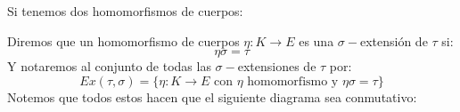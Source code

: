 \begin{definicion}
    Si tenemos dos homomorfismos de cuerpos:
    \begin{figure}[H]
        \centering
    \end{figure}
    \noindent
    Diremos que un homomorfismo de cuerpos $\eta:K\to E$ es una $\sigma-$extensión de $\tau$ si:
    \begin{equation*}
        \eta\sigma = \tau
    \end{equation*}
    \noindent
    Y notaremos al conjunto de todas las $\sigma-$extensiones de $\tau$ por:
    \begin{equation*}
        Ex(\tau,\sigma) = \{\eta:K\to E \text{\ con\ } \eta \text{\ homomorfismo y\ } \eta \sigma = \tau\}
    \end{equation*}
    Notemos que todos estos hacen que el siguiente diagrama sea conmutativo:
    \begin{figure}[H]
        \centering
    \end{figure}
\end{definicion}

